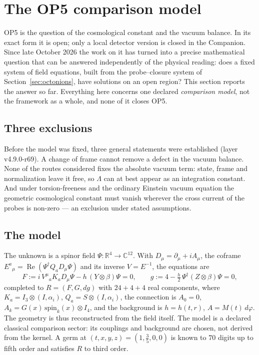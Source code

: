 \section{The OP5 comparison model}\label{sec:op5}

OP5 is the question of the cosmological constant and the vacuum balance.  In its exact form it is open; only a local detector
version is closed in the Companion.  Since late October 2026 the work on it has turned into a precise mathematical question that
can be answered independently of the physical reading: does a fixed system of field equations, built from the probe--closure
system of Section~\ref{sec:octonions}, have solutions on an open region?  This section reports the answer so far.  Everything here
concerns one declared \emph{comparison model}, not the framework as a whole, and none of it closes OP5.

\subsection{Three exclusions}

Before the model was fixed, three general statements were established (layer v4.9.0-r69).  A change of frame cannot remove a defect
in the vacuum balance.  None of the routes considered fixes the absolute vacuum term: state, frame and normalization leave it free, so
\(\Lambda\) can at best appear as an integration constant.  And under torsion-freeness and the ordinary Einstein vacuum equation the
geometric cosmological constant must vanish wherever the cross current of the probes is non-zero --- an exclusion under stated
assumptions.

\subsection{The model}

The unknown is a spinor field \(\Psi\colon\mathbb R^4\to\mathbb C^{12}\).  With
\(D_\mu=\partial_\mu+iA_\mu\), the coframe \(E^a{}_\mu=\operatorname{Re}(\Psi^\dagger Q_aD_\mu\Psi)\) and its inverse \(V=E^{-1}\), the equations are
\[
F:=i\,V^\mu{}_a K_a D_\mu\Psi-h\,(Y\otimes\beta)\Psi=0,\qquad
g:=4-\tfrac h2\,\Psi^\dagger(Z\otimes\beta)\Psi=0,
\]
completed to \(R=(F,G,dg)\) with \(24+4+4\) real components, where \(K_a=I_3\otimes(I,\alpha_i)\), \(Q_a=S\otimes(I,\alpha_i)\), the connection is
\(A_0=0\), \(A_k=G(x)\,\mathrm{spin}_k(x)\otimes I_4\), and the background is \(h=h(t,r)\), \(A=M(t)\,d\varphi\).  The geometry is thus
reconstructed from the field itself.  The model is a declared classical comparison sector: its couplings and background are chosen,
not derived from the kernel.  A germ at \((t,x,y,z)=(1,\tfrac35,0,0)\) is known to \(70\) digits up to fifth order and satisfies \(R\) to
third order.

